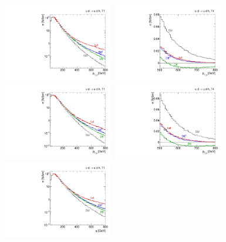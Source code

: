 \begin{figure}
  \includegraphics[width=0.43\textwidth]{fig/validity/WBF_T1_j1pt.pdf} 
  \hspace*{0.05\textwidth}
  \includegraphics[width=0.43\textwidth]{fig/validity/WBF_T4_j1pt_zoom.pdf}\\
  \includegraphics[width=0.43\textwidth]{fig/validity/WBF_T1_Hpt.pdf} 
  \hspace*{0.05\textwidth}
  \includegraphics[width=0.43\textwidth]{fig/validity/WBF_T4_Hpt.pdf}\\
  \includegraphics[width=0.43\textwidth]{fig/validity/WBF_T1_q.pdf} 

\end{figure}
